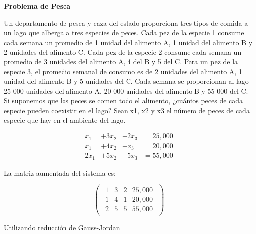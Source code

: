 \documentclass{article}
\begin{document}
\begin{large}
    \textbf{Problema de Pesca}
\end{large}

Un departamento de pesca y caza del estado proporciona tres tipos de comida a un lago que alberga a tres especies de peces. Cada pez de la especie 1 consume cada semana un promedio de 1 unidad del alimento A, 1 unidad del alimento B y 2 unidades del alimento C. Cada pez de la especie 2 consume cada semana un promedio de 3 unidades del alimento A, 4 del B y 5 del C. Para un pez de la especie 3, el promedio semanal de consumo es de 2 unidades del alimento A, 1 unidad del alimento B y 5 unidades del C. Cada semana se proporcionan al lago 25 000 unidades del alimento A, 20 000 unidades del alimento B y 55 000 del C. Si suponemos que los peces se comen todo el alimento, ¿cuántos peces de cada especie pueden coexistir en el lago? Sean x1, x2 y x3 el número de peces de cada especie que hay en el ambiente del lago.

\begin{equation*}
    \begin{aligned}
        x_1 &+ 3x_2 &+ 2x_3 &= 25,000\\
        x_1 &+ 4x_2 &+ x_3 &= 20,000\\
        2x_1 &+ 5x_2 &+ 5x_3 &= 55,000
    \end{aligned}
\end{equation*}

La matriz aumentada del sistema es:

\begin{equation*}
    \begin{pmatrix}
        \begin{array}{rrr|r}
            1 & 3 & 2 & 25,000\\
            1 & 4 & 1 & 20,000 \\
            2 & 5 & 5 & 55,000
        \end{array}
    \end{pmatrix}
\end{equation*}

Utilizando reducción de Gauss-Jordan
\end{document}
